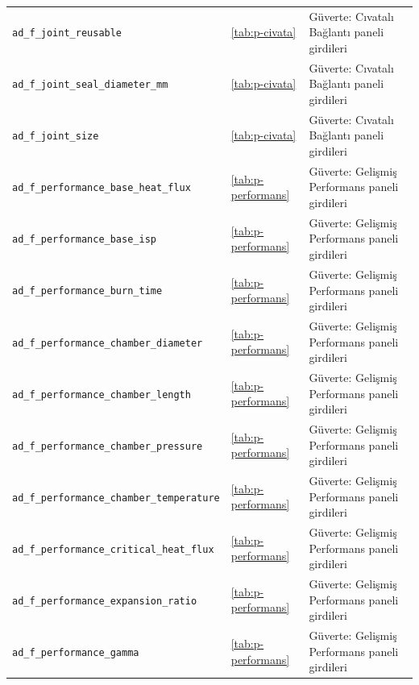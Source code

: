 \documentclass[11pt,a4paper]{article}
\begin{document}
{\begin{longtable}{@{}>{\raggedright\arraybackslash}p{5.2cm}p{1.4cm}>{\raggedright\arraybackslash}p{7.4cm}@{}}
\texttt{ad\_\allowbreak{}f\_\allowbreak{}joint\_\allowbreak{}reusable} & \ref{tab:p-civata} & Güverte: Cıvatalı Bağlantı paneli girdileri \\
\texttt{ad\_\allowbreak{}f\_\allowbreak{}joint\_\allowbreak{}seal\_\allowbreak{}diameter\_\allowbreak{}mm} & \ref{tab:p-civata} & Güverte: Cıvatalı Bağlantı paneli girdileri \\
\texttt{ad\_\allowbreak{}f\_\allowbreak{}joint\_\allowbreak{}size} & \ref{tab:p-civata} & Güverte: Cıvatalı Bağlantı paneli girdileri \\
\texttt{ad\_\allowbreak{}f\_\allowbreak{}performance\_\allowbreak{}base\_\allowbreak{}heat\_\allowbreak{}flux} & \ref{tab:p-performans} & Güverte: Gelişmiş Performans paneli girdileri \\
\texttt{ad\_\allowbreak{}f\_\allowbreak{}performance\_\allowbreak{}base\_\allowbreak{}isp} & \ref{tab:p-performans} & Güverte: Gelişmiş Performans paneli girdileri \\
\texttt{ad\_\allowbreak{}f\_\allowbreak{}performance\_\allowbreak{}burn\_\allowbreak{}time} & \ref{tab:p-performans} & Güverte: Gelişmiş Performans paneli girdileri \\
\texttt{ad\_\allowbreak{}f\_\allowbreak{}performance\_\allowbreak{}chamber\_\allowbreak{}diameter} & \ref{tab:p-performans} & Güverte: Gelişmiş Performans paneli girdileri \\
\texttt{ad\_\allowbreak{}f\_\allowbreak{}performance\_\allowbreak{}chamber\_\allowbreak{}length} & \ref{tab:p-performans} & Güverte: Gelişmiş Performans paneli girdileri \\
\texttt{ad\_\allowbreak{}f\_\allowbreak{}performance\_\allowbreak{}chamber\_\allowbreak{}pressure} & \ref{tab:p-performans} & Güverte: Gelişmiş Performans paneli girdileri \\
\texttt{ad\_\allowbreak{}f\_\allowbreak{}performance\_\allowbreak{}chamber\_\allowbreak{}temperature} & \ref{tab:p-performans} & Güverte: Gelişmiş Performans paneli girdileri \\
\texttt{ad\_\allowbreak{}f\_\allowbreak{}performance\_\allowbreak{}critical\_\allowbreak{}heat\_\allowbreak{}flux} & \ref{tab:p-performans} & Güverte: Gelişmiş Performans paneli girdileri \\
\texttt{ad\_\allowbreak{}f\_\allowbreak{}performance\_\allowbreak{}expansion\_\allowbreak{}ratio} & \ref{tab:p-performans} & Güverte: Gelişmiş Performans paneli girdileri \\
\texttt{ad\_\allowbreak{}f\_\allowbreak{}performance\_\allowbreak{}gamma} & \ref{tab:p-performans} & Güverte: Gelişmiş Performans paneli girdileri \\

\end{longtable}}
\end{document}
